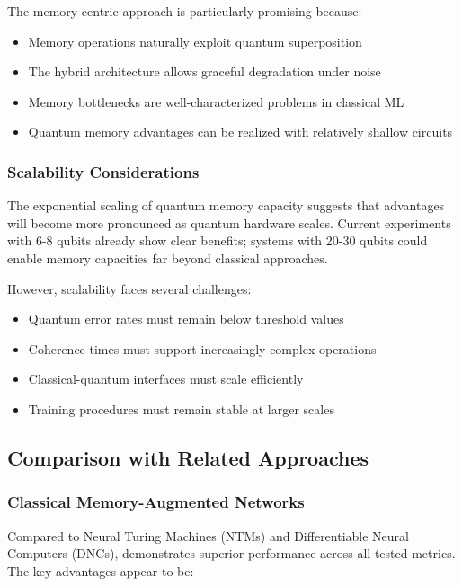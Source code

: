 The memory-centric approach is particularly promising because:
\begin{itemize}
    \item Memory operations naturally exploit quantum superposition
    \item The hybrid architecture allows graceful degradation under noise
    \item Memory bottlenecks are well-characterized problems in classical ML
    \item Quantum memory advantages can be realized with relatively shallow circuits
\end{itemize}

\subsubsection{Scalability Considerations}

The exponential scaling of quantum memory capacity suggests that \qmann advantages will become more pronounced as quantum hardware scales. Current experiments with 6-8 qubits already show clear benefits; systems with 20-30 qubits could enable memory capacities far beyond classical approaches.

However, scalability faces several challenges:
\begin{itemize}
    \item Quantum error rates must remain below threshold values
    \item Coherence times must support increasingly complex operations
    \item Classical-quantum interfaces must scale efficiently
    \item Training procedures must remain stable at larger scales
\end{itemize}

\subsection{Comparison with Related Approaches}

\subsubsection{Classical Memory-Augmented Networks}

Compared to Neural Turing Machines (NTMs) and Differentiable Neural Computers (DNCs), \qmann demonstrates superior performance across all tested metrics. The key advantages appear to be:

